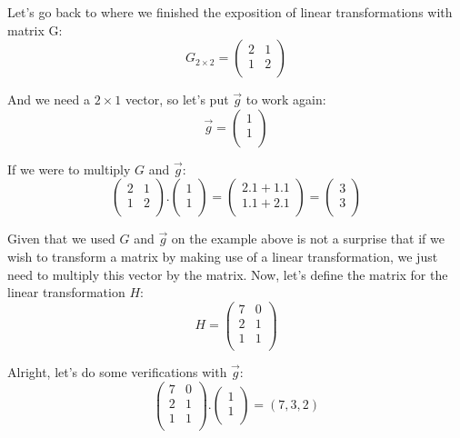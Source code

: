 \documentclass[a4,12pt,twosided,openany]{memoir}
\begin{document}
\par 
\indent
Let’s go back to where we finished the exposition of linear transformations with matrix G:
\[ G_{2\times2} = 
\begin{pmatrix}
2 & 1 \\
1 & 2 \\
\end{pmatrix}
\]
\par 
\indent
And we need a $2\times1$ vector, so let’s put $\overrightarrow{g}$ to work again:
\[\overrightarrow{g} = 
\begin{pmatrix}
1\\
1\\
\end{pmatrix}
\]
\par 
\indent
If we were to multiply $G$ and $\overrightarrow{g}$:
\[
\begin{pmatrix}
2 & 1 \\
1 & 2 \\
\end{pmatrix} .\begin{pmatrix}
1\\
1\\
\end{pmatrix} = \begin{pmatrix}
2.1 + 1.1 \\
1.1 + 2.1 \\
\end{pmatrix}  =  \begin{pmatrix}
3 \\
3 \\
\end{pmatrix}
\]
\par 
\indent
Given that we used $G$ and $\overrightarrow{g}$ on the example above is not a surprise that if we wish to transform a matrix by making use of a linear transformation, we just need to multiply this vector by the matrix.
Now, let’s define the matrix for the linear transformation $H$:
\[H = \begin{pmatrix}
7 & 0 \\
2 & 1 \\
1 & 1 \\
\end{pmatrix}
\]
\par 
\indent
Alright, let’s do some verifications with $\overrightarrow{g}$:
\[ \begin{pmatrix}
7 & 0 \\
2 & 1 \\
1 & 1 \\
\end{pmatrix}.\begin{pmatrix}
1 \\
1 \\
\end{pmatrix}  = (7,3,2)\]
\end{document}
